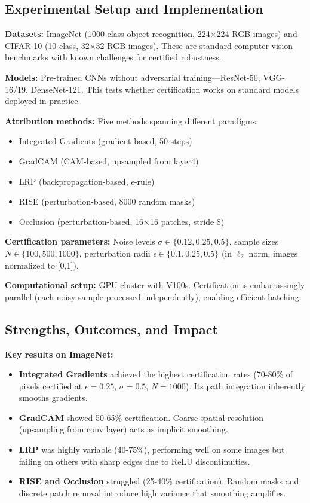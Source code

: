 \documentclass[11pt]{article}
\begin{document}
\subsection{Experimental Setup and Implementation}

\textbf{Datasets:} ImageNet (1000-class object recognition, 224×224 RGB images) and CIFAR-10 (10-class, 32×32 RGB images). These are standard computer vision benchmarks with known challenges for certified robustness.

\textbf{Models:} Pre-trained CNNs without adversarial training—ResNet-50, VGG-16/19, DenseNet-121. This tests whether certification works on standard models deployed in practice.

\textbf{Attribution methods:} Five methods spanning different paradigms:
\begin{itemize}
    \item Integrated Gradients (gradient-based, 50 steps)
    \item GradCAM (CAM-based, upsampled from layer4)
    \item LRP (backpropagation-based, $\epsilon$-rule)
    \item RISE (perturbation-based, 8000 random masks)
    \item Occlusion (perturbation-based, 16×16 patches, stride 8)
\end{itemize}

\textbf{Certification parameters:} Noise levels $\sigma \in \{0.12, 0.25, 0.5\}$, sample sizes $N \in \{100, 500, 1000\}$, perturbation radii $\epsilon \in \{0.1, 0.25, 0.5\}$ (in $\ell_2$ norm, images normalized to [0,1]).

\textbf{Computational setup:} GPU cluster with V100s. Certification is embarrassingly parallel (each noisy sample processed independently), enabling efficient batching.

\subsection{Strengths, Outcomes, and Impact}

\textbf{Key results on ImageNet:}
\begin{itemize}
    \item \textbf{Integrated Gradients} achieved the highest certification rates (70-80\% of pixels certified at $\epsilon=0.25$, $\sigma=0.5$, $N=1000$). Its path integration inherently smooths gradients.
    \item \textbf{GradCAM} showed 50-65\% certification. Coarse spatial resolution (upsampling from conv layer) acts as implicit smoothing.
    \item \textbf{LRP} was highly variable (40-75\%), performing well on some images but failing on others with sharp edges due to ReLU discontinuities.
    \item \textbf{RISE and Occlusion} struggled (25-40\% certification). Random masks and discrete patch removal introduce high variance that smoothing amplifies.
\end{itemize}
\end{document}
